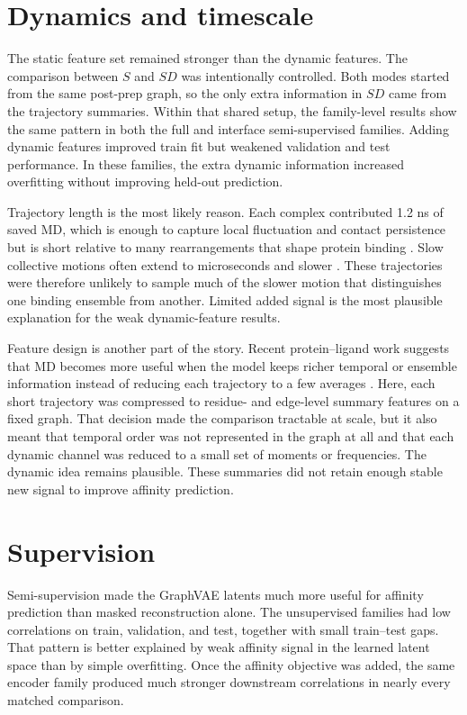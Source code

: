 \section{Dynamics and timescale}

The static feature set remained stronger than the dynamic features. The comparison between $S$ and $SD$ was intentionally controlled. Both modes started from the same post-prep graph, so the only extra information in $SD$ came from the trajectory summaries. Within that shared setup, the family-level results show the same pattern in both the full and interface semi-supervised families. Adding dynamic features improved train fit but weakened validation and test performance. In these families, the extra dynamic information increased overfitting without improving held-out prediction.

Trajectory length is the most likely reason. Each complex contributed 1.2 ns of saved MD, which is enough to capture local fluctuation and contact persistence but is short relative to many rearrangements that shape protein binding \citep{HenzlerWildman2007Dynamic,Kastritis2011Benchmark,Siebenmorgen2020PPIReview}. Slow collective motions often extend to microseconds and slower \citep{HenzlerWildman2007Dynamic}. These trajectories were therefore unlikely to sample much of the slower motion that distinguishes one binding ensemble from another. Limited added signal is the most plausible explanation for the weak dynamic-feature results.

Feature design is another part of the story. Recent protein--ligand work suggests that MD becomes more useful when the model keeps richer temporal or ensemble information instead of reducing each trajectory to a few averages \citep{Min2024Dynaformer,Libouban2025Spatiotemporal}. Here, each short trajectory was compressed to residue- and edge-level summary features on a fixed graph. That decision made the comparison tractable at scale, but it also meant that temporal order was not represented in the graph at all and that each dynamic channel was reduced to a small set of moments or frequencies. The dynamic idea remains plausible. These summaries did not retain enough stable new signal to improve affinity prediction.

\section{Supervision}

Semi-supervision made the GraphVAE latents much more useful for affinity prediction than masked reconstruction alone. The unsupervised families had low correlations on train, validation, and test, together with small train--test gaps. That pattern is better explained by weak affinity signal in the learned latent space than by simple overfitting. Once the affinity objective was added, the same encoder family produced much stronger downstream correlations in nearly every matched comparison.

